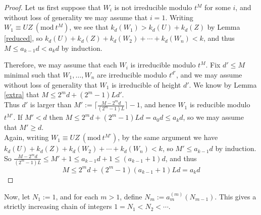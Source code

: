 \documentclass{article}
\newcommand{\Mod}[1]{\ (\mathrm{mod}\ #1)}
\theoremstyle{plain}
\theoremstyle{definition}
\theoremstyle{remark}
\theoremstyle{plain}
\begin{document}
\begin{proof}
\noindent Let us first suppose that $W_i$ is not irreducible modulo $t^M$ for some $i$, and without loss of generality we may assume that $i=1$. Writing $W_1\equiv UZ\Mod{t^{M}}$, we see that $k_d(W_1)>k_d(U)+k_d(Z)$ by Lemma \ref{reduced}, so $k_d(U)+k_d(Z)+k_d(W_2)+\cdots+k_d(W_n)<k$, and thus $M\leq a_{k-1}d< a_k d$ by induction.

Therefore, we may assume that each $W_i$ is irreducible modulo $t^M$. Fix $d'\leq M$ minimal such that $W_1,\dots,W_n$ are irreducible modulo $t^{d'}$, and we may assume without loss of generality that $W_1$ is irreducible of height $d'$. We know by Lemma \ref{extra} that $M\leq 2^md+(2^m-1)Ld'$.\\

\noindent Thus $d'$ is larger than $M':= \lceil \frac{M-2^md}{(2^m-1)L}\rceil-1$, and hence $W_1$ is reducible modulo $t^{M'}$. If $M'<d$ then $M\leq 2^md+(2^m-1)Ld=a_0d\leq a_kd$, so we may assume that $M'\geq d$.\\

\noindent Again, writing $W_1\equiv UZ\Mod{t^{M'}}$, by the same argument we have $k_d(U)+k_d(Z)+k_d(W_2)+\cdots+k_d(W_n)<k$, so $M'\leq a_{k-1}d$ by induction.\\ 

\noindent So $\frac{M-2^md}{(2^m-1)L}\leq M'+1\leq a_{k-1}d+1\leq (a_{k-1}+1)d$, and thus $$M\leq 2^md+(2^m-1)(a_{k-1}+1)Ld=a_kd$$\qedhere
\end{proof}

\noindent Now, let $N_1:=1$, and for each $m>1$, define $N_m:=a_m^{(m)}(N_{m-1})$. This gives a strictly increasing chain of integers $1=N_1<N_2<\cdots$.
\end{document}
